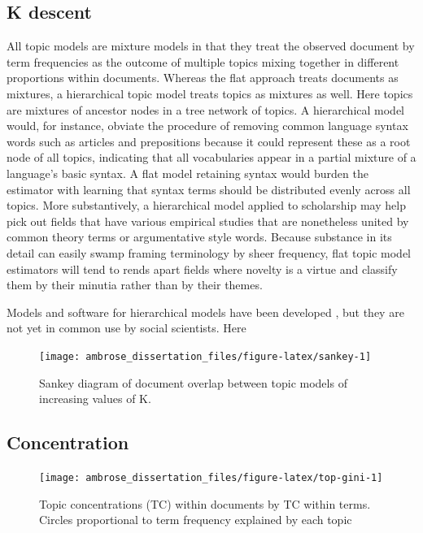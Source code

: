 \documentclass[]{book}
\theoremstyle{definition}
\theoremstyle{definition}
\theoremstyle{definition}
\theoremstyle{remark}
\begin{document}
\hypertarget{k-descent}{%
\subsection{K descent}\label{k-descent}}

All topic models are mixture models in that they treat the observed
document by term frequencies as the outcome of multiple topics mixing
together in different proportions within documents. Whereas the flat
approach treats documents as mixtures, a hierarchical topic model treats
topics as mixtures as well. Here topics are mixtures of ancestor nodes
in a tree network of topics. A hierarchical model would, for instance,
obviate the procedure of removing common language syntax words such as
articles and prepositions because it could represent these as a root
node of all topics, indicating that all vocabularies appear in a partial
mixture of a language's basic syntax. A flat model retaining syntax
would burden the estimator with learning that syntax terms should be
distributed evenly across all topics. More substantively, a hierarchical
model applied to scholarship may help pick out fields that have various
empirical studies that are nonetheless united by common theory terms or
argumentative style words. Because substance in its detail can easily
swamp framing terminology by sheer frequency, flat topic model
estimators will tend to rends apart fields where novelty is a virtue and
classify them by their minutia rather than by their themes.

Models and software for hierarchical models have been developed
\citep{Teh2006Hierarchical, Roberts2015pkg}, but they are not yet in
common use by social scientists. Here

\begin{figure}

{\centering \texttt{[image: ambrose\_dissertation\_files/figure-latex/sankey-1]} 

}

\caption{Sankey diagram of document overlap between topic models of increasing values of K.}\label{fig:sankey}
\end{figure}

\hypertarget{concentration}{%
\subsection{Concentration}\label{concentration}}

\begin{figure}

{\centering \texttt{[image: ambrose\_dissertation\_files/figure-latex/top-gini-1]} 

}

\caption{Topic concentrations (TC) within documents by TC within terms. Circles proportional to term frequency explained by each topic}\label{fig:top-gini}
\end{figure}
\end{document}
